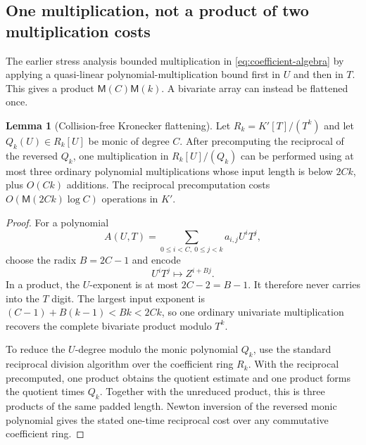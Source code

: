 \documentclass[11pt,a4paper]{article}
\theoremstyle{definition}
\newtheorem{lemma}[theorem]{Lemma}
\theoremstyle{remark}
\newcommand{\Mmul}{\mathsf M}
\begin{document}
\subsection{One multiplication, not a product of two multiplication costs}\label{sec:flat-multiplication}

The earlier stress analysis bounded multiplication in \eqref{eq:coefficient-algebra} by applying a quasi-linear polynomial-multiplication bound first in $U$ and then in $T$.  This gives a product $\Mmul(C)\Mmul(k)$.  A bivariate array can instead be flattened once.

\begin{lemma}[Collision-free Kronecker flattening]\label{lem:kronecker-flat}
Let
$R_k=K'[T]/(T^k)$ and let $Q_k(U)\in R_k[U]$ be monic of degree $C$.  After precomputing the reciprocal of the reversed $Q_k$, one multiplication in
$R_k[U]/(Q_k)$ can be performed using at most three ordinary polynomial multiplications whose input length is below $2Ck$, plus $O(Ck)$ additions.  The reciprocal precomputation costs
$O(\Mmul(2Ck)\log C)$ operations in $K'$.
\end{lemma}

\begin{proof}
For a polynomial
\[
 A(U,T)=\sum_{0\le i<C,\ 0\le j<k}a_{i,j}U^iT^j,
\]
choose the radix $B=2C-1$ and encode
\begin{equation}\label{eq:kronecker-map}
 U^iT^j\longmapsto Z^{i+Bj}.
\end{equation}
In a product, the $U$-exponent is at most $2C-2=B-1$.  It therefore never carries into the $T$ digit.  The largest input exponent is
$(C-1)+B(k-1)<Bk<2Ck$, so one ordinary univariate multiplication recovers the complete bivariate product modulo $T^k$.

To reduce the $U$-degree modulo the monic polynomial $Q_k$, use the standard reciprocal division algorithm over the coefficient ring $R_k$.  With the reciprocal precomputed, one product obtains the quotient estimate and one product forms the quotient times $Q_k$.  Together with the unreduced product, this is three products of the same padded length.  Newton inversion of the reversed monic polynomial gives the stated one-time reciprocal cost over any commutative coefficient ring.
\end{proof}
\end{document}
